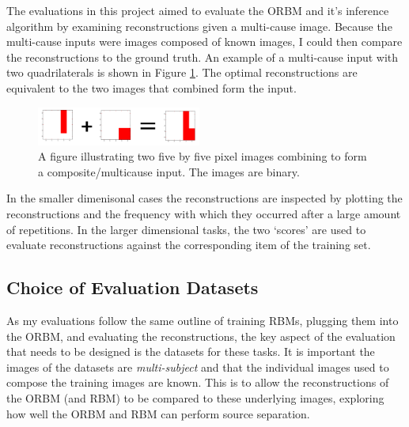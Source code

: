 The evaluations in this project aimed to evaluate the ORBM and it's inference algorithm by examining reconstructions given a multi-cause image. Because the multi-cause inputs were images composed of known images, I could then compare the reconstructions to the ground truth. An example of a multi-cause input with two quadrilaterals is shown in Figure \ref{F:Composite-Example}. The optimal reconstructions are equivalent to the two images that combined form the input.

\begin{figure}
  \begin{center}
    \includegraphics[width=0.48\textwidth]{Assets/Composite-Example.png}
  \end{center}
  \caption{A figure illustrating two five by five pixel images combining to form a composite/multicause input. The images are binary.}
  \label{F:Composite-Example}
\end{figure}

In the smaller dimenisonal cases the reconstructions are inspected by plotting the reconstructions and the frequency with which they occurred after a large amount of repetitions. In the larger dimensional tasks, the two `scores' are used to evaluate reconstructions against the corresponding item of the training set.


\subsection{Choice of Evaluation Datasets}

As my evaluations follow the same outline of training RBMs, plugging them into the ORBM, and evaluating the reconstructions, the key aspect of the evaluation that needs to be designed is the datasets for these tasks. It is important the images of the datasets are \emph{multi-subject} and that the individual images used to compose the training images are known. This is to allow the reconstructions of the ORBM (and RBM) to be compared to these underlying images, exploring how well the ORBM and RBM can perform source separation.

